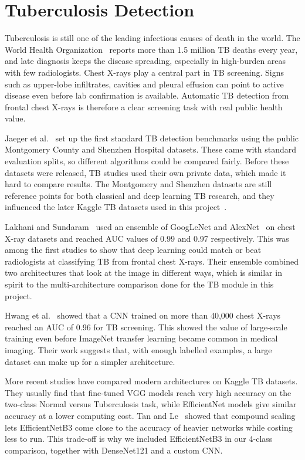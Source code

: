 \section{Tuberculosis Detection}

Tuberculosis is still one of the leading infectious causes of death in the world. The World Health Organization~\cite{who2022} reports more than 1.5 million TB deaths every year, and late diagnosis keeps the disease spreading, especially in high-burden areas with few radiologists. Chest X-rays play a central part in TB screening. Signs such as upper-lobe infiltrates, cavities and pleural effusion can point to active disease even before lab confirmation is available. Automatic TB detection from frontal chest X-rays is therefore a clear screening task with real public health value.

Jaeger et al.~\cite{jaeger2014} set up the first standard TB detection benchmarks using the public Montgomery County and Shenzhen Hospital datasets. These came with standard evaluation splits, so different algorithms could be compared fairly. Before these datasets were released, TB studies used their own private data, which made it hard to compare results. The Montgomery and Shenzhen datasets are still reference points for both classical and deep learning TB research, and they influenced the later Kaggle TB datasets used in this project~\cite{tbkaggle}.

Lakhani and Sundaram~\cite{lakhani2017} used an ensemble of GoogLeNet and AlexNet~\cite{krizhevsky2012} on chest X-ray datasets and reached AUC values of 0.99 and 0.97 respectively. This was among the first studies to show that deep learning could match or beat radiologists at classifying TB from frontal chest X-rays. Their ensemble combined two architectures that look at the image in different ways, which is similar in spirit to the multi-architecture comparison done for the TB module in this project.

Hwang et al.~\cite{hwang2016} showed that a CNN trained on more than 40,000 chest X-rays reached an AUC of 0.96 for TB screening. This showed the value of large-scale training even before ImageNet transfer learning became common in medical imaging. Their work suggests that, with enough labelled examples, a large dataset can make up for a simpler architecture.

More recent studies have compared modern architectures on Kaggle TB datasets. They usually find that fine-tuned VGG models reach very high accuracy on the two-class Normal versus Tuberculosis task, while EfficientNet models give similar accuracy at a lower computing cost. Tan and Le~\cite{tan2019} showed that compound scaling lets EfficientNetB3 come close to the accuracy of heavier networks while costing less to run. This trade-off is why we included EfficientNetB3 in our 4-class comparison, together with DenseNet121 and a custom CNN.

